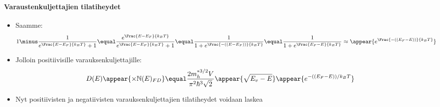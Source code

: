 \begin{frame}
\frametitle{\texorpdfstring{\culine[\sectiontitleulinecolor]{\sectiontitle}}{\sectiontitle} }
\framesubtitle{Varaustenkuljettajien tilatiheydet}
\appear{}

\begin{itemize}
	\item Saamme:
\[
1 \minus \frac{1}{e^{\Frac{E-E_{F}}{k_{B} T}}+1} \equal \frac{e^{\Frac{E-E_{F}}{k_{B} T}}}{e^{\Frac{E-E_{F}}{k_{B} T}}+1} \equal \frac{1}{1+e^{\Frac{- \textrm{((}E-E_{F} \textrm{))}}{k_{B} T}}} \equal \frac{1}{1+e^{\Frac{E_{F}-E}{k_{B} T}}} \approx \appear{e^{\Frac{- \textrm{((}E_{F}-E \textrm{))}}{k_{B} T}}}
\]

\item Jolloin positiivisille varauksenkuljettajille:
\[
D(E) \appear{\times  \mathbb{N} (E)_{F D}} \equal \frac{2 m_{h}^{* 3 / 2} V}{\pi^{2} \hbar^{3} \sqrt{2}} \appear{\sqrt{E_{v}-E}} \appear{e^{- \textrm{((}E_{F}-E \textrm{))} /k_{B} T}}
\]
\item Nyt positiivisten ja negatiivisten varauksenkuljettajien tilatiheydet voidaan laskea
\end{itemize}

\endofslide 
\end{frame}

